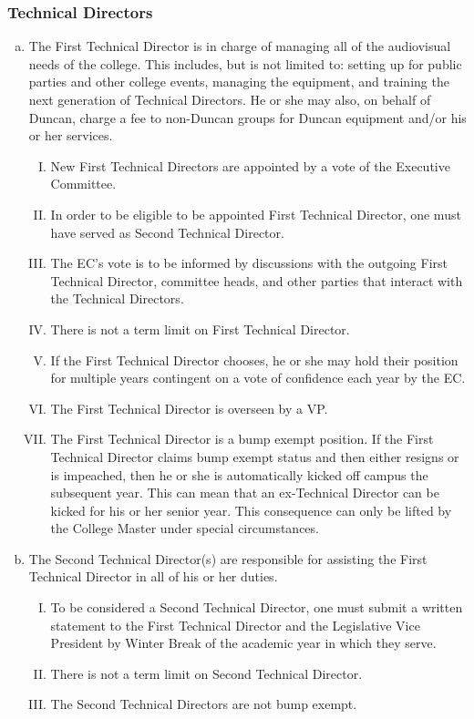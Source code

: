 \documentclass[USletter,12pt]{article}
\begin{document}
\begin{enumerate}[(a)]
\subsubsection{Technical Directors}
\begin{enumerate}[(a)]
\item The First Technical Director is in charge of managing all of the audiovisual needs of the college.  This includes, but is not limited to: setting up for public parties and other college events, managing the equipment, and training the next generation of Technical Directors.  He or she may also, on behalf of Duncan, charge a fee to non-Duncan groups for Duncan equipment and/or his or her services.
	\begin{enumerate}[(I)]
	\item New First Technical Directors are appointed by a vote of the Executive Committee.
	\item In order to be eligible to be appointed First Technical Director, one must have served as Second Technical Director.
	\item The EC's vote is to be informed by discussions with the outgoing First Technical Director, committee heads, and other parties that interact with the Technical Directors.
	\item There is not a term limit on First Technical Director.
	\item If the First Technical Director chooses, he or she may hold their position for multiple years contingent on a vote of confidence each year by the EC.
	\item The First Technical Director is overseen by a VP.
	\item The First Technical Director is a bump exempt position.  If the First Technical Director claims bump exempt status and then either resigns or is impeached, then he or she is automatically kicked off campus the subsequent year.  This can mean that an ex-Technical Director can be kicked for his or her senior year.  This consequence can only be lifted by the College Master under special circumstances.
	\end{enumerate}
\item The Second Technical Director(s) are responsible for assisting the First Technical Director in all of his or her duties.
	\begin{enumerate}[(I)]
	\item To be considered a Second Technical Director, one must submit a written statement to the First Technical Director and the Legislative Vice President by Winter Break of the academic year in which they serve.
	\item There is not a term limit on Second Technical Director.
	\item The Second Technical Directors are not bump exempt.
	\end{enumerate}
\end{enumerate}



\end{enumerate}
\end{document}
